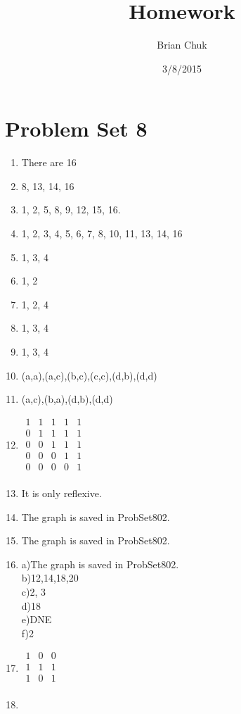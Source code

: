 \documentclass[11pt]{article}
\title{\textbf{Homework}}
\author{Brian Chuk}
\date{3/8/2015}
\begin{document}
\maketitle

\section{Problem Set 8}
\begin{enumerate}
\item There are 16
\item 8, 13, 14, 16
\item 1, 2, 5, 8, 9, 12, 15, 16.
\item 1, 2, 3, 4, 5, 6, 7, 8, 10, 11, 13, 14, 16
\item 1, 3, 4
\item 1, 2
\item 1, 2, 4
\item 1, 3, 4
\item 1, 3, 4
\item (a,a),(a,c),(b,c),(c,c),(d,b),(d,d)
\item (a,c),(b,a),(d,b),(d,d)
\item $
\begin{matrix}
  1 & 1 & 1 & 1 & 1 \\
  0 & 1 & 1 & 1 & 1 \\
  0 & 0 & 1 & 1 & 1 \\
  0 & 0 & 0 & 1 & 1 \\
  0 & 0 & 0 & 0 & 1 \\
 \end{matrix}$
\item It is only reflexive.
\item The graph is saved in ProbSet802.
\item The graph is saved in ProbSet802.
\item a)The graph is saved in ProbSet802.\\
	  b)12,14,18,20\\
	  c)2, 3\\
	  d)18\\
	  e)DNE\\
	  f)2\\
\item $
\begin{matrix}
  1 & 0 & 0 \\
  1 & 1 & 1 \\
  1 & 0 & 1 \\
 \end{matrix}$
\item

\end{enumerate}
\end{document}
